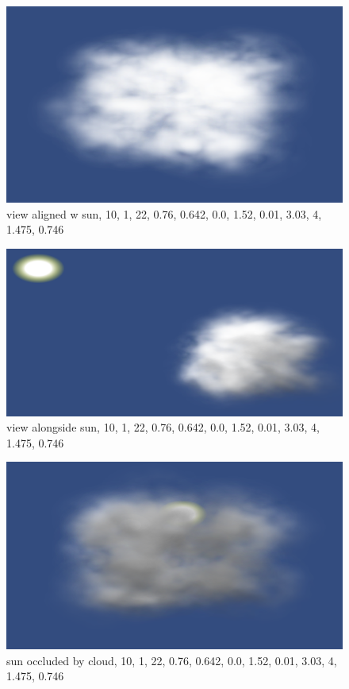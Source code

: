 \begin{figure}[h]
\centering
\includegraphics[width=\textwidth]{../res/res3.png}
\caption{view aligned w sun, 10, 1, 22, 0.76, 0.642, 0.0, 1.52, 0.01, 3.03, 4, 1.475, 0.746}
\end{figure}

\begin{figure}[h]
\centering
\includegraphics[width=\textwidth]{../res/res3-1.png}
\caption{view alongside sun, 10, 1, 22, 0.76, 0.642, 0.0, 1.52, 0.01, 3.03, 4, 1.475, 0.746}
\end{figure}

\begin{figure}[h]
\centering
\includegraphics[width=\textwidth]{../res/res3-2.png}
\caption{sun occluded by cloud, 10, 1, 22, 0.76, 0.642, 0.0, 1.52, 0.01, 3.03, 4, 1.475, 0.746}
\end{figure}



